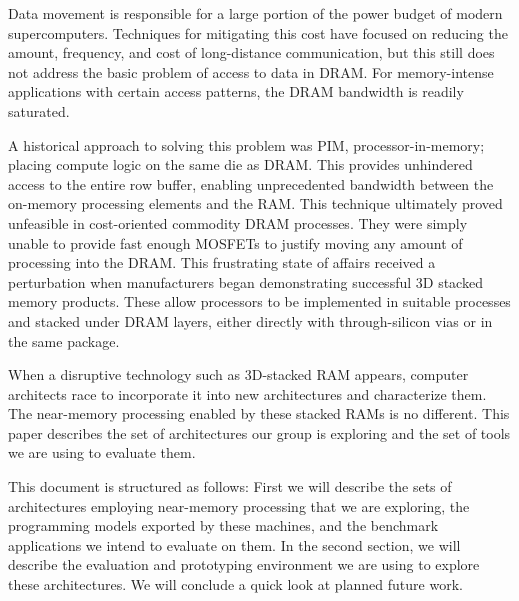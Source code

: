 
Data movement is responsible for a large portion of the power budget of modern supercomputers.
Techniques for mitigating this cost have focused on reducing the amount, frequency, and cost of long-distance communication, but this still does not address the basic problem of access to data in DRAM.
For memory-intense applications with certain access patterns, the DRAM bandwidth is readily saturated.

A historical approach to solving this problem was PIM, processor-in-memory; placing compute logic on the same die as DRAM.
This provides unhindered access to the entire row buffer, enabling unprecedented bandwidth between the on-memory processing elements and the RAM.
This technique ultimately proved unfeasible in cost-oriented commodity DRAM processes.
They were simply unable to provide fast enough MOSFETs to justify moving any amount of processing into the DRAM.
This frustrating state of affairs received a perturbation when manufacturers began demonstrating successful 3D stacked memory products.
These allow processors to be implemented in suitable processes and stacked under DRAM layers, either directly with through-silicon vias or in the same package.

When a disruptive technology such as 3D-stacked RAM appears, computer architects race to incorporate it into new architectures and characterize them.
The near-memory processing enabled by these stacked RAMs is no different.
This paper describes the set of architectures our group is exploring and the set of tools we are using to evaluate them.

This document is structured as follows:
First we will describe the sets of architectures employing near-memory processing that we are exploring, the programming models exported by these machines, and the benchmark applications we intend to evaluate on them.
In the second section, we will describe the evaluation and prototyping environment we are using to explore these architectures.
We will conclude a quick look at planned future work.
